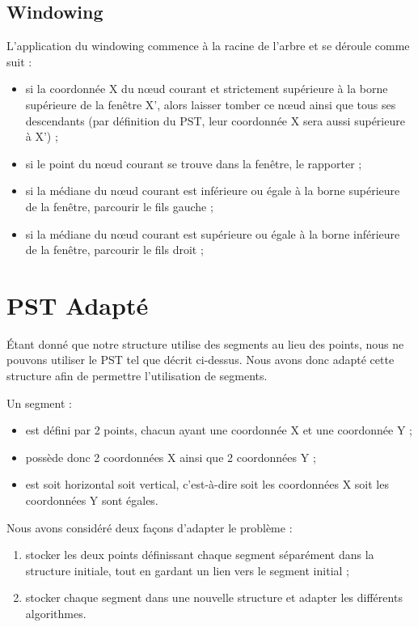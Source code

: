 \documentclass[10pt,a4paper]{article}
\begin{document}
\subsection{Windowing}
L'application du windowing commence à la racine de l'arbre et se déroule comme suit :
\begin{itemize}
	\item si la coordonnée X du nœud courant et strictement supérieure à la borne supérieure de la fenêtre X', alors laisser tomber ce nœud ainsi que tous ses descendants (par définition du PST, leur coordonnée X sera aussi supérieure à X') ;
	\item si le point du nœud courant se trouve dans la fenêtre, le rapporter ;
	\item si la médiane du nœud courant est inférieure ou égale à la borne supérieure de la fenêtre, parcourir le fils gauche ;
	\item si la médiane du nœud courant est supérieure ou égale à la borne inférieure de la fenêtre, parcourir le fils droit ;
\end{itemize}


\newpage
\section{PST Adapté}

Étant donné que notre structure utilise des segments au lieu des points, nous ne pouvons utiliser le PST tel que décrit ci-dessus. Nous avons donc adapté cette structure afin de permettre l'utilisation de segments.

Un segment :
\begin{itemize}
	\item est défini par 2 points, chacun ayant une coordonnée X et une coordonnée Y ;
	\item possède donc 2 coordonnées X ainsi que 2 coordonnées Y ;
	\item est soit horizontal soit vertical, c'est-à-dire soit les coordonnées X soit les coordonnées Y sont égales.
\end{itemize}

Nous avons considéré deux façons d'adapter le problème :
\begin{enumerate}
	\item stocker les deux points définissant chaque segment séparément dans la structure initiale, tout en gardant un lien vers le segment initial ;
	\item stocker chaque segment dans une nouvelle structure et adapter les différents algorithmes.
\end{enumerate}
\end{document}
